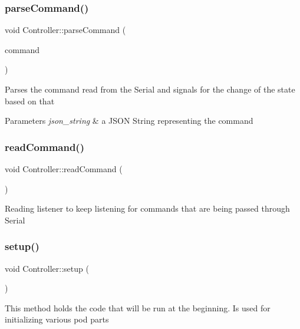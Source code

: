 \subsubsection{\texorpdfstring{parse\+Command()}{parseCommand()}}
{\footnotesize\ttfamily void Controller\+::parse\+Command (\begin{DoxyParamCaption}\item[{String}]{command }\end{DoxyParamCaption})\hspace{0.3cm}{\ttfamily [private]}}

Parses the command read from the Serial and signals for the change of the state based on that 
\begin{DoxyParams}{Parameters}
{\em json\+\_\+string} & a J\+S\+ON String representing the command \\
\hline
\end{DoxyParams}
\mbox{\label{class_controller_af9cb9dacdc34443221b21ee9d6be7549}} 
\subsubsection{\texorpdfstring{read\+Command()}{readCommand()}}
{\footnotesize\ttfamily void Controller\+::read\+Command (\begin{DoxyParamCaption}{ }\end{DoxyParamCaption})\hspace{0.3cm}{\ttfamily [private]}}

Reading listener to keep listening for commands that are being passed through Serial \mbox{\label{class_controller_aaff2c0ac01c4d7a6b78718ac8a411c4b}} 
\subsubsection{\texorpdfstring{setup()}{setup()}}
{\footnotesize\ttfamily void Controller\+::setup (\begin{DoxyParamCaption}{ }\end{DoxyParamCaption})}

This method holds the code that will be run at the beginning. Is used for initializing various pod parts 

